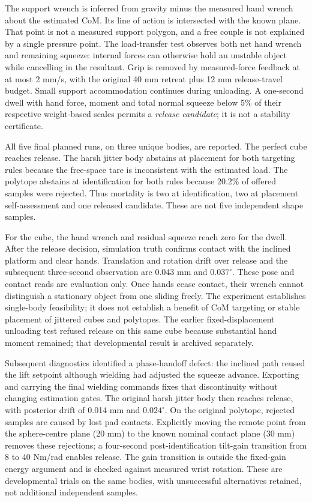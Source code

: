 The support wrench is inferred from gravity minus the measured hand wrench about the estimated CoM. Its line of action is intersected with the known plane. That point is not a measured support polygon, and a free couple is not explained by a single pressure point. The load-transfer test observes both net hand wrench and remaining squeeze: internal forces can otherwise hold an unstable object while cancelling in the resultant. Grip is removed by measured-force feedback at at most 2 mm/s, with the original 40 mm retreat plus 12 mm release-travel budget. Small support accommodation continues during unloading. A one-second dwell with hand force, moment and total normal squeeze below 5\% of their respective weight-based scales permits a \emph{release candidate}; it is not a stability certificate.

All five final planned runs, on three unique bodies, are reported. The perfect cube reaches release. The harsh jitter body abstains at placement for both targeting rules because the free-space tare is inconsistent with the estimated load. The polytope abstains at identification for both rules because 20.2\% of offered samples were rejected. Thus mortality is two at identification, two at placement self-assessment and one released candidate. These are not five independent shape samples.

For the cube, the hand wrench and residual squeeze reach zero for the dwell. After the release decision, simulation truth confirms contact with the inclined platform and clear hands. Translation and rotation drift over release and the subsequent three-second observation are 0.043 mm and $0.037^\circ$. These pose and contact reads are evaluation only. Once hands cease contact, their wrench cannot distinguish a stationary object from one sliding freely. The experiment establishes single-body feasibility; it does not establish a benefit of CoM targeting or stable placement of jittered cubes and polytopes. The earlier fixed-displacement unloading test refused release on this same cube because substantial hand moment remained; that developmental result is archived separately.

Subsequent diagnostics identified a phase-handoff defect: the inclined path reused the lift setpoint although wielding had adjusted the squeeze advance. Exporting and carrying the final wielding commands fixes that discontinuity without changing estimation gates. The original harsh jitter body then reaches release, with posterior drift of 0.014 mm and $0.024^\circ$. On the original polytope, rejected samples are caused by lost pad contacts. Explicitly moving the remote point from the sphere-centre plane (20 mm) to the known nominal contact plane (30 mm) removes these rejections; a four-second post-identification tilt-gain transition from 8 to 40 Nm/rad enables release. The gain transition is outside the fixed-gain energy argument and is checked against measured wrist rotation. These are developmental trials on the same bodies, with unsuccessful alternatives retained, not additional independent samples.

